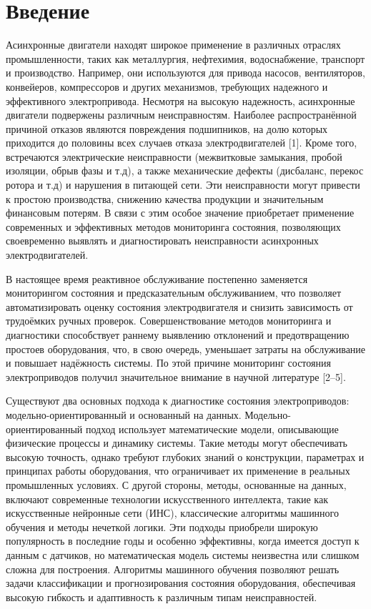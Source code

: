 \chapter*{Введение}

Асинхронные двигатели находят широкое применение в различных отраслях промышленности, таких как металлургия, нефтехимия, водоснабжение, транспорт и производство. Например, они используются для привода насосов, вентиляторов, конвейеров, компрессоров и других механизмов, требующих надежного и эффективного электропривода. Несмотря на высокую надежность, асинхронные двигатели подвержены различным неисправностям. Наиболее распространённой причиной отказов являются повреждения подшипников, на долю которых приходится до половины всех случаев отказа электродвигателей [1]. Кроме того, встречаются электрические неисправности (межвитковые замыкания, пробой изоляции, обрыв фазы и т.д), а также механические дефекты (дисбаланс, перекос ротора и т.д) и нарушения в питающей сети. Эти неисправности могут привести к простою производства, снижению качества продукции и значительным финансовым потерям. В связи с этим особое значение приобретает применение современных и эффективных методов мониторинга состояния, позволяющих своевременно выявлять и диагностировать неисправности асинхронных электродвигателей.

В настоящее время реактивное обслуживание постепенно заменяется мониторингом состояния и предсказательным обслуживанием, что позволяет автоматизировать оценку состояния электродвигателя и снизить зависимость от трудоёмких ручных проверок. Совершенствование методов мониторинга и диагностики способствует раннему выявлению отклонений и предотвращению простоев оборудования, что, в свою очередь, уменьшает затраты на обслуживание и повышает надёжность системы. По этой причине мониторинг состояния электроприводов получил значительное внимание в научной литературе [2--5].

Существуют два основных подхода к диагностике состояния электроприводов: модельно-ориентированный и основанный на данных. Модельно-ориентированный подход использует математические модели, описывающие физические процессы и динамику системы. Такие методы могут обеспечивать высокую точность, однако требуют глубоких знаний о конструкции, параметрах и принципах работы оборудования, что ограничивает их применение в реальных промышленных условиях. С другой стороны, методы, основанные на данных, включают современные технологии искусственного интеллекта, такие как искусственные нейронные сети (ИНС), классические алгоритмы машинного обучения и методы нечеткой логики. Эти подходы приобрели широкую популярность в последние годы и особенно эффективны, когда имеется доступ к данным с датчиков, но математическая модель системы неизвестна или слишком сложна для построения. Алгоритмы машинного обучения позволяют решать задачи классификации и прогнозирования состояния оборудования, обеспечивая высокую гибкость и адаптивность к различным типам неисправностей.

